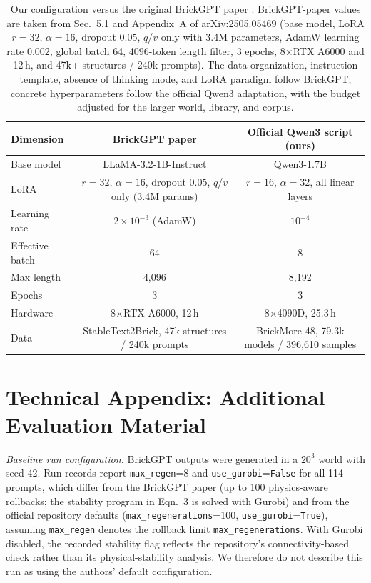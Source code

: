 \documentclass[letterpaper]{article} %
\begin{document}
\begin{table}[!htbp]
\centering
\small
\setlength{\tabcolsep}{5pt}
\begin{tabular}{lcc}
\toprule
Dimension & BrickGPT paper & Official Qwen3 script (ours) \\
\midrule
Base model & LLaMA-3.2-1B-Instruct & Qwen3-1.7B \\
LoRA & $r=32$, $\alpha=16$, dropout $0.05$, $q$/$v$ only (3.4M params) & $r=16$, $\alpha=32$, all linear layers \\
Learning rate & $2{\times}10^{-3}$ (AdamW) & $10^{-4}$ \\
Effective batch & 64 & 8 \\
Max length & 4,096 & 8,192 \\
Epochs & 3 & 3 \\
Hardware & 8$\times$RTX A6000, 12\,h & 8$\times$4090D, 25.3\,h \\
Data & StableText2Brick, 47k structures / 240k prompts & BrickMore-48, 79.3k models / 396,610 samples \\
\bottomrule
\end{tabular}
\caption{Our configuration versus the original BrickGPT paper \cite{brickgpt}. BrickGPT-paper values are taken from Sec.~5.1 and Appendix~A of arXiv:2505.05469 (base model, LoRA $r{=}32$, $\alpha{=}16$, dropout $0.05$, $q$/$v$ only with 3.4M parameters, AdamW learning rate $0.002$, global batch 64, 4096-token length filter, 3 epochs, 8$\times$RTX A6000 and 12\,h, and 47k+ structures / 240k prompts). The data organization, instruction template, absence of thinking mode, and LoRA paradigm follow BrickGPT; concrete hyperparameters follow the official Qwen3 adaptation, with the budget adjusted for the larger world, library, and corpus.}
\label{tab:brickgpt-recipe}
\end{table}


\section{Technical Appendix: Additional Evaluation Material}
\label{app:eval}

\emph{Baseline run configuration.} BrickGPT outputs were generated in a $20^3$ world with seed 42. Run records report \texttt{max\_regen}=8 and \texttt{use\_gurobi}=\texttt{False} for all 114 prompts, which differ from the BrickGPT paper (up to 100 physics-aware rollbacks; the stability program in Eqn.~3 is solved with Gurobi) and from the official repository defaults (\texttt{max\_regenerations}=100, \texttt{use\_gurobi}=\texttt{True}), assuming \texttt{max\_regen} denotes the rollback limit \texttt{max\_regenerations}. With Gurobi disabled, the recorded stability flag reflects the repository's connectivity-based check rather than its physical-stability analysis. We therefore do not describe this run as using the authors' default configuration.
\end{document}
